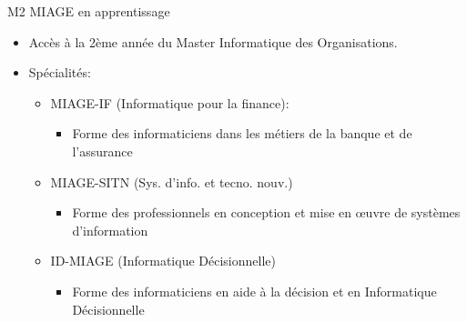 \documentclass[minimal,compress]{beamer}
\begin{document}
\begin{frame}{M2 MIAGE en apprentissage}

\begin{itemize}
\item Accès à la \alert{2ème année} du Master Informatique des Organisations.
\item Spécialités:
\begin{itemize}
\item \alert{MIAGE-IF} (Informatique pour la finance):
\begin{itemize}
\item Forme des informaticiens dans les métiers de la \alert{banque et de l’assurance}
\end{itemize}
\item \alert{MIAGE-SITN} (Sys. d’info. et tecno. nouv.)
\begin{itemize}
\item Forme des professionnels en conception et mise en œuvre de \alert{systèmes d’information}
\end{itemize}
\item \alert{ID-MIAGE} (Informatique Décisionnelle)
\begin{itemize}
\item Forme des informaticiens en \alert{aide à la décision et en Informatique Décisionnelle}
\end{itemize}
\end{itemize}
\end{itemize}

\end{frame}

\end{document}
